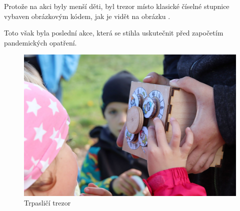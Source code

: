 Protože na akci byly menší děti, byl trezor místo klasické číselné stupnice 
vybaven obrázkovým kódem, jak je vidět na obrázku . %

Toto však byla poslední akce, která se stihla uskutečnit před započetím pandemických opatření.

\begin{figure}[htbp]
    \centering
    \includegraphics[width=\textwidth]{kapitoly/obrazky/M3/trpaslici.png}
    \caption{Trpasličí trezor}
    \label{fig:M3-trpaslici}
\end{figure}